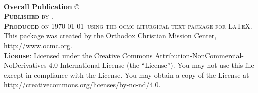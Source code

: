 \newpage
~\vfill
\thispagestyle{empty}

%

%

%

\noindent \textbf{Overall Publication} \copyright\ \\ %

\noindent \textsc{\textbf{Published} by .}\\ %

\noindent \textsc{\textbf{Produced} on \today\ using the ocmc-liturgical-text package for \LaTeX}. This package was created by the Orthodox Christian Mission Center, \url{http://www.ocmc.org}.\\ 

\noindent \textbf{License}: Licensed under the Creative Commons Attribution-NonCommercial-NoDerivatives 4.0 International License (the ``License''). You may not use this file except in compliance with the License. You may obtain a copy of the License at \url{http://creativecommons.org/licenses/by-nc-nd/4.0}.\\ %


